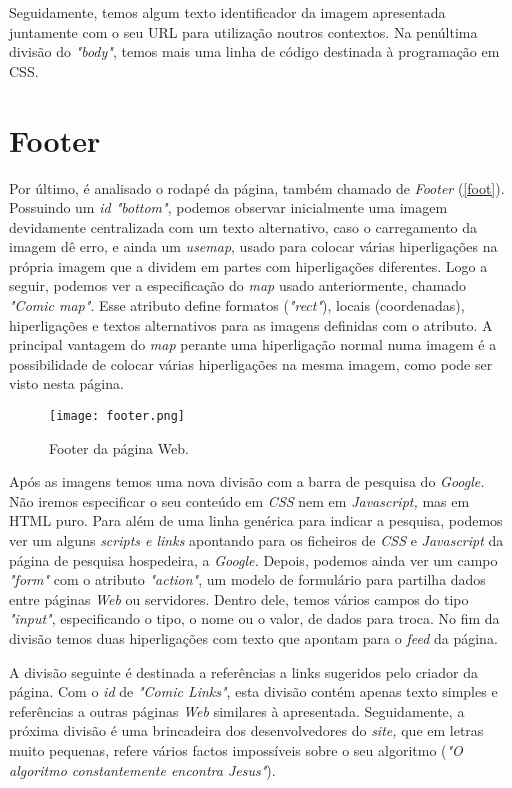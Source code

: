 \documentclass[11pt,openright,twoside]{report}
\begin{document}
Seguidamente, temos algum texto identificador da imagem apresentada juntamente com o seu URL para utilização noutros contextos. Na penúltima divisão do \textit{"body"}, temos mais uma linha de código destinada à programação em CSS.
\smallskip


\section{Footer}
Por último, é analisado o rodapé da página, também chamado de \textit{Footer} (\autoref{foot}). Possuindo um \textit{id "bottom"}, podemos observar inicialmente uma imagem devidamente centralizada com um texto alternativo, caso o carregamento da imagem dê erro, e ainda um \textit{usemap}, usado para colocar várias hiperligações na própria imagem que a dividem em partes com hiperligações diferentes. Logo a seguir, podemos ver a especificação do \textit{map} usado anteriormente, chamado \textit{"Comic map"}. Esse atributo define formatos (\textit{"rect"}), locais (coordenadas), hiperligações e textos alternativos para as imagens definidas com o atributo. A principal vantagem do \textit{map} perante uma hiperligação normal numa imagem é a possibilidade de colocar várias hiperligações na mesma imagem, como pode ser visto nesta página.
\smallskip 

\begin{figure}
 \center
 \texttt{[image: footer.png]}
 \caption{Footer da página Web.}
 \label{foot}
\end{figure}


Após as imagens temos uma nova divisão com a barra de pesquisa do \textit{Google.} Não iremos especificar o seu conteúdo em \textit{CSS} nem em \textit{Javascript,} mas em HTML puro. Para além de uma linha genérica para indicar a pesquisa, podemos ver um alguns \textit{scripts e links} apontando para os ficheiros de\textit{ CSS} e \textit{Javascript} da página de pesquisa hospedeira, a \textit{Google.} Depois, podemos ainda ver um campo\textit{ "form"} com o atributo \textit{"action"}, um modelo de formulário para partilha dados entre páginas \textit{Web} ou servidores. Dentro dele, temos vários campos do tipo \textit{"input"}, especificando o tipo, o nome ou o valor, de dados para troca. No fim da divisão temos duas hiperligações com texto que apontam para o \textit{feed} da página.
\smallskip 

A divisão seguinte é destinada a referências a links sugeridos pelo criador da página. Com o \textit{id} de \textit{"Comic Links"}, esta divisão contém apenas texto simples e referências a outras páginas \textit{Web} similares à apresentada. Seguidamente, a próxima divisão é uma brincadeira dos desenvolvedores do \textit{site,} que em letras muito pequenas, refere vários factos impossíveis sobre o seu algoritmo (\textit{"O algoritmo constantemente encontra Jesus"}).
\smallskip 
\end{document}
